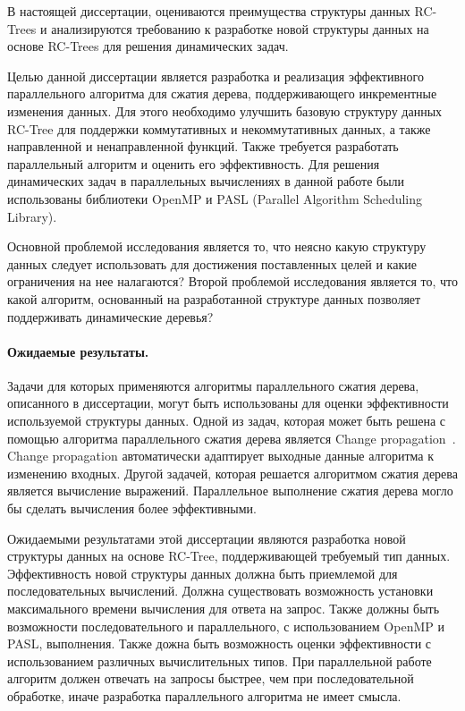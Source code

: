 \documentclass[specification,annotation]{itmo-student-thesis}
\begin{document}
В настоящей диссертации, оцениваются преимущества структуры данных RC-Trees и анализируются требованию к разработке новой структуры данных на 
основе RC-Trees для решения динамических задач.

Целью данной диссертации является разработка и реализация эффективного параллельного алгоритма для сжатия дерева, поддерживающего инкрементные изменения 
данных. Для этого необходимо улучшить базовую структуру данных RC-Tree для поддержки коммутативных и некоммутативных данных, а также направленной и 
ненаправленной функций. Также требуется разработать параллельный алгоритм и оценить его эффективность. Для решения динамических задач в параллельных вычислениях 
в данной работе были использованы библиотеки OpenMP и PASL (Parallel Algorithm Scheduling Library).

Основной проблемой исследования является то, что неясно какую структуру данных следует использовать для достижения поставленных целей и какие ограничения 
на нее налагаются?
Второй проблемой исследования является то, что какой алгоритм, основанный на разработанной структуре данных позволяет поддерживать динамические деревья?

\paragraph{Ожидаемые результаты.}

Задачи для которых применяются алгоритмы параллельного сжатия дерева, описанного в диссертации, могут быть использованы для оценки эффективности 
используемой структуры данных. Одной из задач, которая может быть решена с помощью алгоритма параллельного сжатия дерева является Change 
propagation~\cite{acar05}.
Change propagation автоматически адаптирует выходные данные алгоритма к изменению входных. Другой задачей, которая решается алгоритмом сжатия дерева 
является вычисление выражений. Параллельное выполнение сжатия дерева могло бы сделать вычисления более эффективными.

Ожидаемыми результатами этой диссертации являются разработка новой структуры данных на основе RC-Tree, поддерживающей требуемый тип данных. Эффективность новой 
структуры данных должна быть приемлемой для последовательных вычислений. Должна существовать возможность установки максимального времени вычисления для ответа 
на запрос. Также должны быть возможности последовательного и параллельного, с использованием OpenMP и PASL, выполнения. Также дожна быть возможность оценки 
эффективности с использованием различных вычислительных типов. При параллельной работе алгоритм должен отвечать на запросы быстрее, чем при последовательной 
обработке, иначе разработка параллельного алгоритма не имеет смысла.
\end{document}
